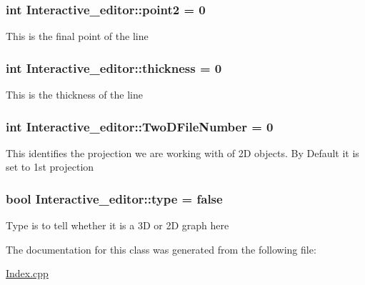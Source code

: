 \subsubsection[{\texorpdfstring{point2}{point2}}]{\setlength{\rightskip}{0pt plus 5cm}int Interactive\+\_\+editor\+::point2 = 0}\hypertarget{classInteractive__editor_af60245cb328db4c6b1ca00f1512dfc75}{}\label{classInteractive__editor_af60245cb328db4c6b1ca00f1512dfc75}
This is the final point of the line 
\subsubsection[{\texorpdfstring{thickness}{thickness}}]{\setlength{\rightskip}{0pt plus 5cm}int Interactive\+\_\+editor\+::thickness = 0}\hypertarget{classInteractive__editor_a65f9bb481055109e9d52e2a6bc2db58e}{}\label{classInteractive__editor_a65f9bb481055109e9d52e2a6bc2db58e}
This is the thickness of the line 
\subsubsection[{\texorpdfstring{Two\+D\+File\+Number}{TwoDFileNumber}}]{\setlength{\rightskip}{0pt plus 5cm}int Interactive\+\_\+editor\+::\+Two\+D\+File\+Number = 0}\hypertarget{classInteractive__editor_a016e5e8e9a124977ab6048c90980be97}{}\label{classInteractive__editor_a016e5e8e9a124977ab6048c90980be97}
This identifies the projection we are working with of 2D objects. By Default it is set to 1st projection 
\subsubsection[{\texorpdfstring{type}{type}}]{\setlength{\rightskip}{0pt plus 5cm}bool Interactive\+\_\+editor\+::type = false}\hypertarget{classInteractive__editor_a93c2f2041e432c8047d51942345cc3f9}{}\label{classInteractive__editor_a93c2f2041e432c8047d51942345cc3f9}
Type is to tell whether it is a 3D or 2D graph here 

The documentation for this class was generated from the following file\+:\begin{DoxyCompactItemize}
\item 
\hyperlink{Index_8cpp}{Index.\+cpp}\end{DoxyCompactItemize}
